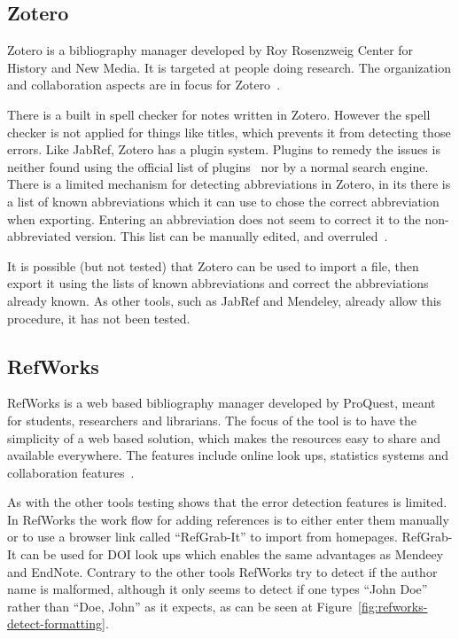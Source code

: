 \subsection{Zotero}

Zotero is a bibliography manager developed by Roy Rosenzweig Center
for History and New Media.  It is targeted at people doing research.
The organization and collaboration aspects are in focus for
Zotero~\cite{zotero_features}.

There is a built in spell checker for notes written in Zotero.
However the spell checker is not applied for things like titles, which
prevents it from detecting those errors.  Like JabRef, Zotero has a
plugin system.  Plugins to remedy the {\bibtex} issues is neither
found using the official list of plugins~\cite{zotero_plugins} nor by
a normal search engine. There is a limited mechanism for detecting
abbreviations in Zotero, in its  there is a list of known
abbreviations which it can use to chose the correct abbreviation when
exporting.  Entering an abbreviation does not seem to correct it to
the non-abbreviated version.  This list can be manually edited, and
overruled~\cite{zotero_abbreviations}.

It is possible (but not tested) that Zotero can be used to import a
{\bibtex} file, then export it using the lists of known abbreviations
and correct the abbreviations already known.  As other tools, such as
JabRef and Mendeley, already allow this procedure, it has not been
tested.


\subsection{RefWorks}
RefWorks is a web based bibliography manager developed by ProQuest,
meant for students, researchers and librarians.  The focus of the tool
is to have the simplicity of a web based solution, which makes the
resources easy to share and available everywhere.  The features
include online look ups, statistics systems and collaboration
features~\cite{refworks_features}.

As with the other tools testing shows that the error detection
features is limited.  In RefWorks the work flow for adding references
is to either enter them manually or to use a browser link called
``RefGrab-It'' to import from homepages.  RefGrab-It can be used for
DOI look ups which enables the same advantages as Mendeey and EndNote.
Contrary to the other tools RefWorks try to detect if the author name
is malformed, although it only seems to detect if one types ``John
Doe'' rather than ``Doe, John'' as it expects, as can be seen at
Figure~\ref{fig:refworks-detect-formatting}.

